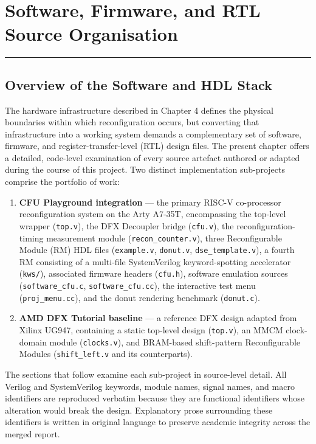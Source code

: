 \chapter{Software, Firmware, and RTL Source Organisation}

\vspace{0.4em}\hrule\vspace{0.4em}

\section{Overview of the Software and HDL Stack}

The hardware infrastructure described in Chapter 4 defines the physical boundaries within which reconfiguration occurs, but converting that infrastructure into a working system demands a complementary set of software, firmware, and register-transfer-level (RTL) design files. The present chapter offers a detailed, code-level examination of every source artefact authored or adapted during the course of this project. Two distinct implementation sub-projects comprise the portfolio of work:

\begin{enumerate}
  \item \textbf{CFU Playground integration} — the primary RISC-V co-processor reconfiguration system on the Arty A7-35T, encompassing the top-level wrapper (\texttt{top.v}), the DFX Decoupler bridge (\texttt{cfu.v}), the reconfiguration-timing measurement module (\texttt{recon\_counter.v}), three Reconfigurable Module (RM) HDL files (\texttt{example.v}, \texttt{donut.v}, \texttt{dse\_template.v}), a fourth RM consisting of a multi-file SystemVerilog keyword-spotting accelerator (\texttt{kws/}), associated firmware headers (\texttt{cfu.h}), software emulation sources (\texttt{software\_cfu.c}, \texttt{software\_cfu.cc}), the interactive test menu (\texttt{proj\_menu.cc}), and the donut rendering benchmark (\texttt{donut.c}).
  \item \textbf{AMD DFX Tutorial baseline} — a reference DFX design adapted from Xilinx UG947, containing a static top-level design (\texttt{top.v}), an MMCM clock-domain module (\texttt{clocks.v}), and BRAM-based shift-pattern Reconfigurable Modules (\texttt{shift\_left.v} and its counterparts).
\end{enumerate}
The sections that follow examine each sub-project in source-level detail. All Verilog and SystemVerilog keywords, module names, signal names, and macro identifiers are reproduced verbatim because they are functional identifiers whose alteration would break the design. Explanatory prose surrounding these identifiers is written in original language to preserve academic integrity across the merged report.

